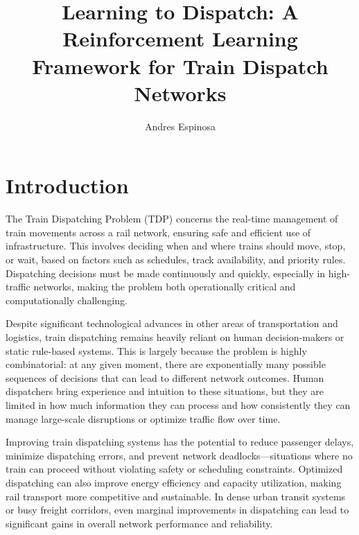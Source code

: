 \documentclass[runningheads]{llncs}
\begin{document}
\title{Learning to Dispatch: A Reinforcement Learning Framework for Train Dispatch Networks}
\titlerunning{\textcolor{uf_blue}{Learning to Dispatch}}

\author{\textcolor{uf_blue}{Andres Espinosa}}
\maketitle


\begin{abstract}

\end{abstract}



\section{Introduction}
\label{sse:introduction}

The Train Dispatching Problem (TDP) concerns the real-time management of train movements across a rail network, ensuring safe and efficient use of infrastructure. 
This involves deciding when and where trains should move, stop, or wait, based on factors such as schedules, track availability, and priority rules. 
Dispatching decisions must be made continuously and quickly, especially in high-traffic networks, making the problem both operationally critical and computationally challenging.

Despite significant technological advances in other areas of transportation and logistics, train dispatching remains heavily reliant on human decision-makers or static rule-based systems. 
This is largely because the problem is highly combinatorial: at any given moment, there are exponentially many possible sequences of decisions that can lead to different network outcomes. 
Human dispatchers bring experience and intuition to these situations, but they are limited in how much information they can process and how consistently they can manage large-scale disruptions or optimize traffic flow over time.

Improving train dispatching systems has the potential to reduce passenger delays, minimize dispatching errors, and prevent network deadlocks—situations where no train can proceed without violating safety or scheduling constraints. 
Optimized dispatching can also improve energy efficiency and capacity utilization, making rail transport more competitive and sustainable. 
In dense urban transit systems or busy freight corridors, even marginal improvements in dispatching can lead to significant gains in overall network performance and reliability.
\end{document}

